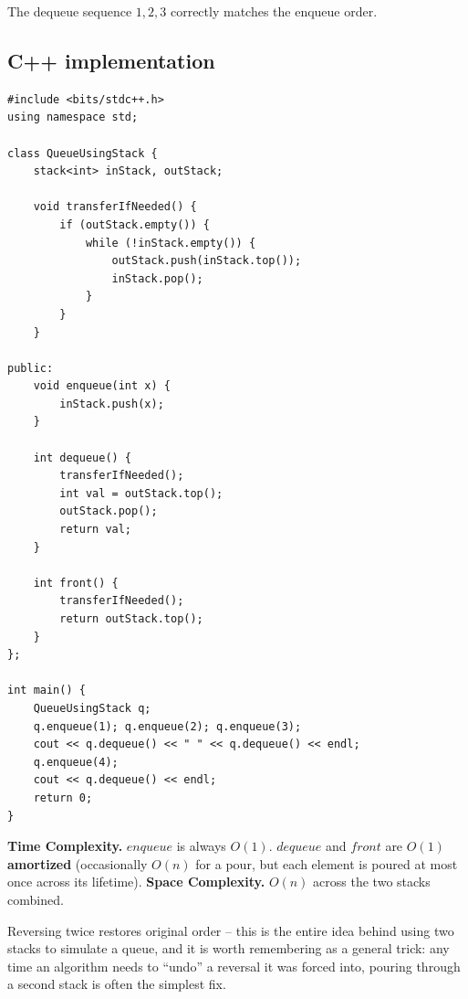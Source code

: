 The dequeue sequence $1,2,3$ correctly matches the enqueue order.

\subsection*{C++ implementation}

\begin{lstlisting}
#include <bits/stdc++.h>
using namespace std;

class QueueUsingStack {
    stack<int> inStack, outStack;

    void transferIfNeeded() {
        if (outStack.empty()) {
            while (!inStack.empty()) {
                outStack.push(inStack.top());
                inStack.pop();
            }
        }
    }

public:
    void enqueue(int x) {
        inStack.push(x);
    }

    int dequeue() {
        transferIfNeeded();
        int val = outStack.top();
        outStack.pop();
        return val;
    }

    int front() {
        transferIfNeeded();
        return outStack.top();
    }
};

int main() {
    QueueUsingStack q;
    q.enqueue(1); q.enqueue(2); q.enqueue(3);
    cout << q.dequeue() << " " << q.dequeue() << endl;
    q.enqueue(4);
    cout << q.dequeue() << endl;
    return 0;
}
\end{lstlisting}

\begin{complexitybox}
\textbf{Time Complexity.} $\textit{enqueue}$ is always $O(1)$.
$\textit{dequeue}$ and $\textit{front}$ are $O(1)$ \textbf{amortized}
(occasionally $O(n)$ for a pour, but each element is poured at most once
across its lifetime).
\textbf{Space Complexity.} $O(n)$ across the two stacks combined.
\end{complexitybox}

\begin{takeawaybox}
Reversing twice restores original order -- this is the entire idea behind
using two stacks to simulate a queue, and it is worth remembering as a
general trick: any time an algorithm needs to ``undo'' a reversal it was
forced into, pouring through a second stack is often the simplest fix.
\end{takeawaybox}
